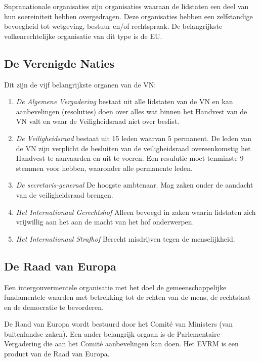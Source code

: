 \documentclass{article}
\begin{document}
Supranationale organisaties zijn organisaties waaraan de lidstaten een deel van
hun soereiniteit hebben overgedragen. Deze organisaties hebben een zelfstandige
bevoegheid tot wetgeving, bestuur en/of rechtspraak. De belangrijkste volkenrechtelijke
organisatie van dit type is de EU.

\subsection{De Verenigde Naties}

Dit zijn de vijf belangrijkste organen van de VN:

\begin{enumerate}

  \item \emph{De Algemene Vergadering} bestaat uit alle lidstaten van de VN en
    kan aanbevelingen (resoluties) doen over alles wat binnen het Handvest van
    de VN valt en waar de Veiligheidsraad niet over beslist.

  \item \emph{De Veiligheidsraad} bestaat uit 15 leden waarvan 5 permanent. De
    leden van de VN zijn verplicht de besluiten van de veiligheidsraad
    overeenkomstig het Handvest te aanvaarden en uit te voeren. Een resulutie
    moet tenminste 9 stemmen voor hebben, waaronder alle permanente leden.

  \item \emph{De secretaris-generaal} De hoogste ambtenaar. Mag zaken onder de
    aandacht van de veiligheidsraad brengen.

  \item \emph{Het Internationaal Gerechtshof} Alleen bevoegd in zaken waarin
    lidstaten zich vrijwillig aan het aan de macht van het hof onderwerpen.

  \item \emph{Het Internationaal Strafhof} Berecht misdrijven tegen de
    menselijkheid.
\end{enumerate}

\subsection{De Raad van Europa}

Een intergouvermentele organisatie met het doel de gemeenschappelijke
fundamentele waarden met betrekking tot de rchten van de mens, de rechtstaat en
de democratie te bevorderen.

De Raad van Europa wordt bestuurd door het Comit\'e van Ministers (van
buitenlandse zaken). Een ander belangrijk orgaan is de Parlementaire
Vergadering die aan het Comit\'e aanbevelingen kan doen. Het EVRM is een
product van de Raad van Europa.
\end{document}
